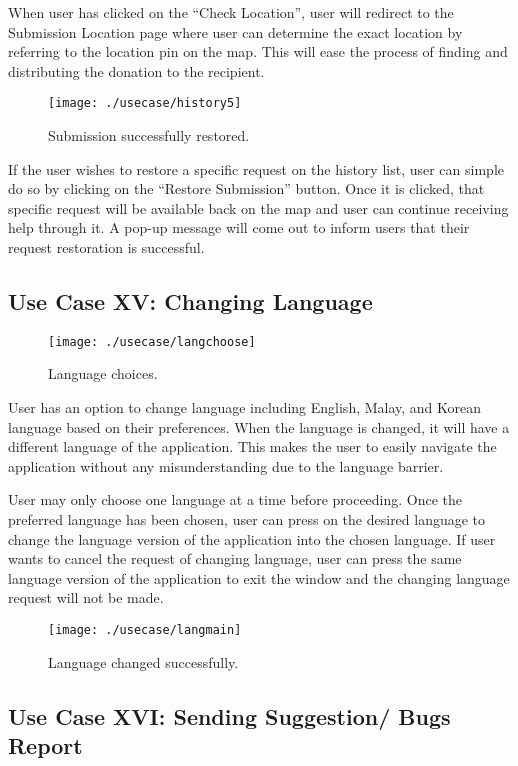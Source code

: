 \documentclass[conference]{IEEEtran}
\begin{document}
When user has clicked on the “Check Location”, user will redirect to the Submission Location page where user can determine the exact location by referring to the location pin on the map. This will ease the process of finding and distributing the donation to the recipient.

\begin{figure}[h!]
\texttt{[image: ./usecase/history5]}
\centering
\caption{Submission successfully restored.}
\end{figure}

If the user wishes to restore a specific request on the history list, user can simple do so by clicking on the “Restore Submission” button. Once it is clicked, that specific request will be available back on the map and user can continue receiving help through it. A pop-up message will come out to inform users that their request restoration is successful.

\subsection{Use Case XV: Changing Language}

\begin{figure}[h!]
\texttt{[image: ./usecase/langchoose]}
\centering
\caption{Language choices.}
\end{figure}

User has an option to change language including English, Malay, and Korean language based on their preferences. When the language is changed, it will have a different language of the application. This makes the user to easily navigate the application without any misunderstanding due to the language barrier.

User may only choose one language at a time before proceeding. Once the preferred language has been chosen, user can press on the desired language to change the language version of the application into the chosen language. If user wants to cancel the request of changing language, user can press the same language version of the application to exit the window and the changing language request will not be made.

\begin{figure}[h!]
\texttt{[image: ./usecase/langmain]}
\centering
\caption{Language changed successfully.}
\end{figure}

\subsection{Use Case XVI: Sending Suggestion/ Bugs Report}
\end{document}

